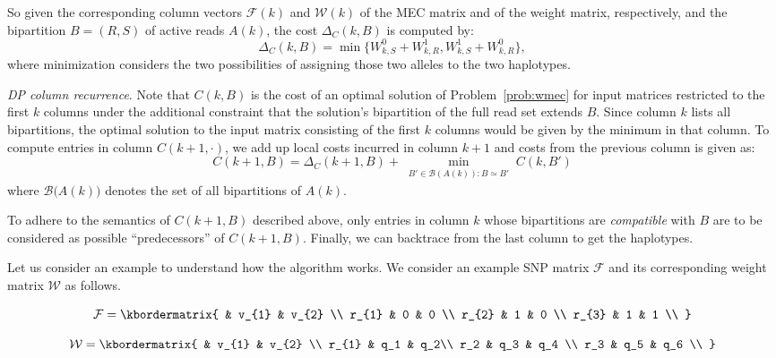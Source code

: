So given the corresponding column vectors $\mathcal{F}(k)$ and $\mathcal{W}(k)$ of the MEC matrix and of the weight matrix, 
respectively, and the bipartition $B=(R,S)$ of active reads $A(k)$, the cost $\Delta_C(k,B)$ is computed by:
\begin{equation}\label{eq:dp-cell-core}
  \Delta_C(k,B)= \min\big\{W_{k,S}^0 + W_{k,R}^1, W_{k,S}^1 + W_{k,R}^0\big\},
\end{equation}
where minimization considers the two possibilities of assigning those two alleles to the two haplotypes.

\textit{DP column recurrence}.
Note that $C(k,B)$ is the cost of an optimal solution of Problem~\ref{prob:wmec} for input matrices restricted to the first $k$ columns 
under the additional constraint that the solution's bipartition of the full read set extends $B$.
Since column $k$ lists all bipartitions, the optimal solution to the input matrix consisting of the first $k$ columns would be given by the minimum in that column.
To compute entries in column $C(k+1,\cdot)$, we add up local costs incurred in column $k+1$ and costs from the previous column is given as:
\begin{equation}\label{eq:dp-recurrence-core}
 C(k+1,B)= \Delta_C(k+1,B) + \min_{\substack{B'\in\mathcal{B}(A(k)):B\simeq B'}}C(k,B')
\end{equation}
where $\mathcal{B}\big(A(k)\big)$ denotes the set of all bipartitions of $A(k)$.
 
To adhere to the semantics of $C(k+1,B)$ described above, only entries in column $k$ whose bipartitions are \emph{compatible} with $B$ are to be considered as possible ``predecessors'' of $C(k+1, B)$.
Finally, we can backtrace from the last column to get the haplotypes.

Let us consider an example to understand how the algorithm works. We consider an example SNP matrix $\mathcal{F}$ and its corresponding weight matrix $\mathcal{W}$ as follows.

\begin{equation}\label{eq:snp_matrix}
  \mathcal{F}  = \kbordermatrix{
     & v_{1}       & v_{2}  \\
    r_{1}       & 0 & 0 \\
    r_{2}       & 1 & 0 \\
    r_{3}       & 1 & 1 \\
  }
\end{equation}

\begin{equation}\label{eq:snp_weight_matrix}
  \mathcal{W}  = \kbordermatrix{
     & v_{1}       & v_{2}  \\
    r_{1}       & q_1 &  q_2\\
    r_2 & q_3 & q_4 \\
    r_3 & q_5 & q_6 \\
  }
\end{equation}

